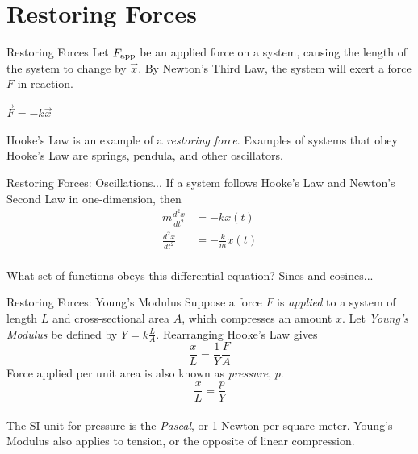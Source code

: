 \documentclass{beamer}
\begin{document}
\section{Restoring Forces}

\begin{frame}{Restoring Forces}
Let $F_{\rm app}$ be an applied force on a system, causing the length of the system to change by $\vec{x}$.  By Newton's Third Law, the system will exert a force $F$ in reaction. \\
\vspace{1cm}
\begin{tcolorbox}[colback=white,colframe=red!40!blue,title=Hooke's Law]
\alert{$\vec{F} = -k\vec{x}$}
\end{tcolorbox}
\vspace{0.5cm}
Hooke's Law is an example of a \textit{restoring force}.  Examples of systems that obey Hooke's Law are springs, pendula, and other oscillators.
\end{frame}

\begin{frame}{Restoring Forces: Oscillations...}
If a system follows Hooke's Law and Newton's Second Law in one-dimension, then \\
\begin{align}
m \frac{d^2x}{dt^2} &= -k x(t) \label{eq:osc1} \\
\frac{d^2x}{dt^2} &= -\frac{k}{m} x(t) \label{eq:osc2}
\end{align} \\
What set of functions obeys this differential equation?  Sines and cosines...
\end{frame}

\begin{frame}{Restoring Forces: Young's Modulus}
Suppose a force $F$ is \textit{applied} to a system of length $L$ and cross-sectional area $A$, which compresses an amount $x$.  Let \textit{Young's Modulus} be defined by $Y = k \frac{L}{A}$.  Rearranging Hooke's Law  gives \\
\begin{equation}
\frac{x}{L} = \frac{1}{Y}\frac{F}{A}
\end{equation}
\vspace{0.5cm}
Force applied per unit area is also known as \textit{pressure}, $p$.
\begin{equation}
\boxed{\frac{x}{L} = \frac{p}{Y}}
\label{eq:young}
\end{equation} \\
The SI unit for pressure is the \textit{Pascal}, or 1 Newton per square meter.  Young's Modulus also applies to tension, or the opposite of linear compression.
\end{frame}
\end{document}
